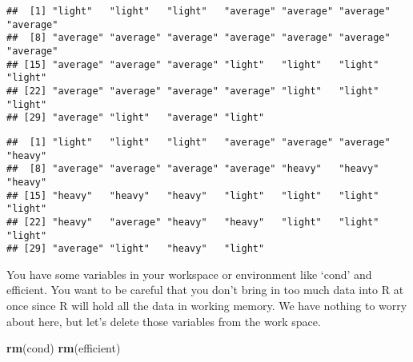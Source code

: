 \documentclass[]{article}
\newenvironment{Shaded}{\begin{snugshade}}{\end{snugshade}}
\newcommand{\KeywordTok}[1]{\textcolor[rgb]{0.13,0.29,0.53}{\textbf{#1}}}
\newcommand{\FloatTok}[1]{\textcolor[rgb]{0.00,0.00,0.81}{#1}}
\newcommand{\StringTok}[1]{\textcolor[rgb]{0.31,0.60,0.02}{#1}}
\newcommand{\OperatorTok}[1]{\textcolor[rgb]{0.81,0.36,0.00}{\textbf{#1}}}
\newcommand{\NormalTok}[1]{#1}
\begin{document}
\begin{Shaded}
\end{Shaded}

\begin{verbatim}
##  [1] "light"   "light"   "light"   "average" "average" "average" "average"
##  [8] "average" "average" "average" "average" "average" "average" "average"
## [15] "average" "average" "average" "light"   "light"   "light"   "light"  
## [22] "average" "average" "average" "average" "light"   "light"   "light"  
## [29] "average" "light"   "average" "light"
\end{verbatim}

\begin{Shaded}
\end{Shaded}

\begin{verbatim}
##  [1] "light"   "light"   "light"   "average" "average" "average" "heavy"  
##  [8] "average" "average" "average" "average" "heavy"   "heavy"   "heavy"  
## [15] "heavy"   "heavy"   "heavy"   "light"   "light"   "light"   "light"  
## [22] "heavy"   "average" "heavy"   "heavy"   "light"   "light"   "light"  
## [29] "average" "light"   "heavy"   "light"
\end{verbatim}

You have some variables in your workspace or environment like `cond' and
efficient. You want to be careful that you don't bring in too much data
into R at once since R will hold all the data in working memory. We have
nothing to worry about here, but let's delete those variables from the
work space.

\begin{Shaded}
\begin{Highlighting}[]
\KeywordTok{rm}\NormalTok{(cond)}
\KeywordTok{rm}\NormalTok{(efficient)}
\end{Highlighting}
\end{Shaded}
\end{document}
